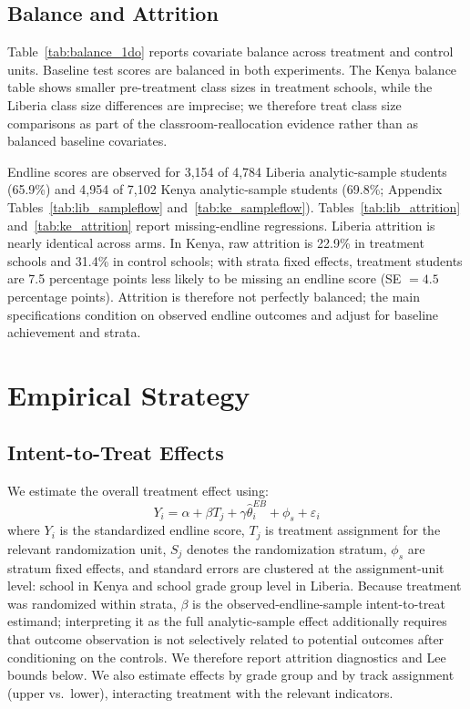 \documentclass[11pt]{article}
\begin{document}
\subsection{Balance and Attrition}

Table~\ref{tab:balance_1do} reports covariate balance across treatment and control units. Baseline test scores are balanced in both experiments. The Kenya balance table shows smaller pre-treatment class sizes in treatment schools, while the Liberia class size differences are imprecise; we therefore treat class size comparisons as part of the classroom-reallocation evidence rather than as balanced baseline covariates.

Endline scores are observed for 3,154 of 4,784 Liberia analytic-sample students (65.9\%) and 4,954 of 7,102 Kenya analytic-sample students (69.8\%; Appendix Tables~\ref{tab:lib_sampleflow} and~\ref{tab:ke_sampleflow}). Tables~\ref{tab:lib_attrition} and~\ref{tab:ke_attrition} report missing-endline regressions. Liberia attrition is nearly identical across arms. In Kenya, raw attrition is 22.9\% in treatment schools and 31.4\% in control schools; with strata fixed effects, treatment students are 7.5 percentage points less likely to be missing an endline score (SE $=4.5$ percentage points). Attrition is therefore not perfectly balanced; the main specifications condition on observed endline outcomes and adjust for baseline achievement and strata.


\section{Empirical Strategy}
\label{sec:strategy}

\subsection{Intent-to-Treat Effects}

We estimate the overall treatment effect using:
\begin{equation}
\label{eq:itt}
Y_i = \alpha + \beta T_j + \gamma \hat{\theta}^{EB}_i + \phi_s + \varepsilon_i
\end{equation}
where $Y_i$ is the standardized endline score, $T_j$ is treatment assignment for the relevant randomization unit, $S_j$ denotes the randomization stratum, $\phi_s$ are stratum fixed effects, and standard errors are clustered at the assignment-unit level: school in Kenya and school grade group level in Liberia. Because treatment was randomized within strata, $\beta$ is the observed-endline-sample intent-to-treat estimand; interpreting it as the full analytic-sample effect additionally requires that outcome observation is not selectively related to potential outcomes after conditioning on the controls. We therefore report attrition diagnostics and Lee bounds below. We also estimate effects by grade group and by track assignment (upper vs.\ lower), interacting treatment with the relevant indicators.
\end{document}
